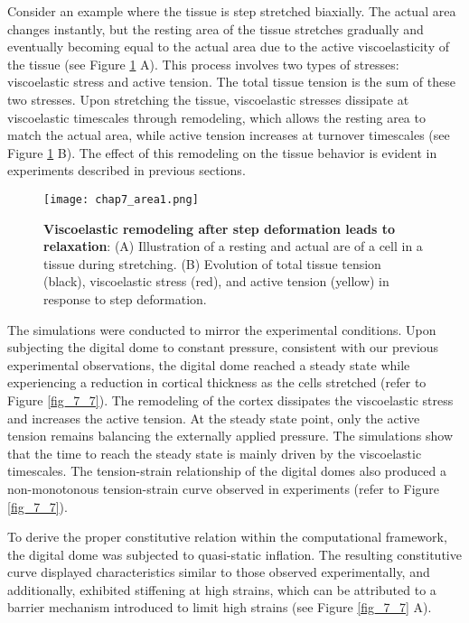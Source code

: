 Consider an example where the tissue is step stretched biaxially. The actual area changes instantly, but the resting area of the tissue stretches gradually and eventually becoming equal to the actual area due to the active viscoelasticity of the tissue (see Figure \ref{fig_7_7a} A). This process involves two types of stresses: viscoelastic stress and active tension. The total tissue tension is the sum of these two stresses. Upon stretching the tissue, viscoelastic stresses dissipate at viscoelastic timescales through remodeling, which allows the resting area to match the actual area, while active tension increases at turnover timescales (see Figure \ref{fig_7_7a} B). The effect of this remodeling on the tissue behavior is evident in experiments described in previous sections.

\begin{figure}[b!]
	\centering
	\texttt{[image: chap7\_area1.png]}
	\caption{\label{fig_7_7a} \textbf{Viscoelastic remodeling after step deformation leads to relaxation}: (A) Illustration of a resting and actual are of a cell in a tissue during stretching. (B) Evolution of total tissue tension (black), viscoelastic stress (red), and active tension (yellow) in response to step deformation.
	}
\end{figure}

The simulations were conducted to mirror the experimental conditions. Upon subjecting the digital dome to constant pressure, consistent with our previous experimental observations, the digital dome reached a steady state while experiencing a reduction in cortical thickness as the cells stretched (refer to Figure \ref{fig_7_7}). The remodeling of the cortex dissipates the viscoelastic stress and increases the active tension. At the steady state point, only the active tension remains balancing the externally applied pressure. The simulations show that the time to reach the steady state is mainly driven by the viscoelastic timescales. The tension-strain relationship of the digital domes also produced a non-monotonous tension-strain curve observed in experiments (refer to Figure \ref{fig_7_7}).

To derive the proper constitutive relation within the computational framework, the digital dome was subjected to quasi-static inflation. The resulting constitutive curve displayed characteristics similar to those observed experimentally, and additionally, exhibited stiffening at high strains, which can be attributed to a barrier mechanism introduced to limit high strains (see Figure \ref{fig_7_7} A).

